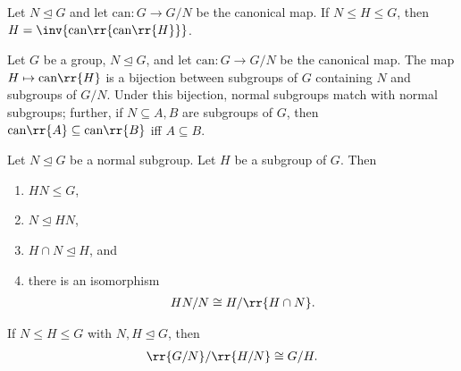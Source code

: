 \documentclass{article}
\begin{document}
\begin{proposition}
  Let $N\trianglelefteq G$ and let $\text{can}:G\to G/N$ be the canonical map. If $N\leq H\leq G$,
  then $H=\inv{\text{can}\rr{\text{can}\rr{H}}}$.
\end{proposition}

\begin{theorem}[Correspondence]
  \label{thm:correspondence}
  Let $G$ be a group, $N\trianglelefteq G$, and let $\text{can}:G\to G/N$ be the canonical map.
  The map $H\mapsto\text{can}\rr{H}$ is a bijection between subgroups of $G$ containing $N$ and
  subgroups of $G/N$. Under this bijection, normal subgroups match with normal subgroups; further,
  if $N\subseteq A,B$ are subgroups of $G$, then $\text{can}\rr{A}\subseteq\text{can}\rr{B}$
  iff $A\subseteq B$.
\end{theorem}

\begin{theorem}
  \label{thm:second-iso-theorem}
  Let $N\trianglelefteq G$ be a normal subgroup. Let $H$ be a subgroup of $G$. Then
  \begin{enumerate}
    \item $HN\leq G$,
    \item $N\trianglelefteq HN$,
    \item $H\cap N\trianglelefteq H$, and
    \item there is an isomorphism \begin{align*}
        HN/N \cong H/\rr{H\cap N}.
      \end{align*}
  \end{enumerate}
\end{theorem}

\begin{theorem}
  \label{thm:third-iso-theorem}
  If $N\leq H\leq G$ with $N,H\trianglelefteq G$, then \begin{align*}
    \rr{G/N}/\rr{H/N}\cong G/H.
  \end{align*}
\end{theorem}
\end{document}
